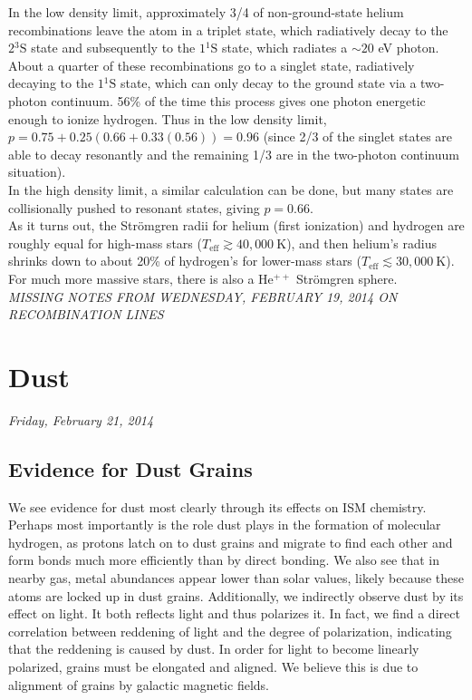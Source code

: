 \documentclass[10pt]{article}
\numberwithin{equation}{section}
\newcommand{\n}{\noindent}
\begin{document}
\n In the low density limit, approximately 3/4 of non-ground-state helium
recombinations leave the atom in a triplet state, which radiatively decay to
the $2 {}^3\mathrm{S}$ state and subsequently to the $1 {}^1\mathrm{S}$ state,
which radiates a $\sim 20$ eV photon. About a quarter of these recombinations
go to a singlet state, radiatively decaying to the $1{}^1\mathrm{S}$ state,
which can only decay to the ground state via a two-photon continuum. 56\% of
the time this process gives one photon energetic enough to ionize hydrogen.
Thus in the low density limit, $p=0.75 + 0.25(0.66+0.33(0.56))= 0.96$ (since
2/3 of the singlet states are able to decay resonantly and the remaining 1/3
are in the two-photon continuum situation).\\

\n In the high density limit, a similar calculation can be done, but many states
are collisionally pushed to resonant states, giving $p=0.66$.\\

\n As it turns out, the Str\"omgren radii for helium (first ionization) and
hydrogen are roughly equal for high-mass stars ($T_{\mathrm{eff}} \gtrsim
40,000\ \mathrm{K}$), and then helium's radius shrinks down to about 20\% of
hydrogen's for lower-mass stars ($T_{\mathrm{eff}}\lesssim 30,000\
\mathrm{K}$). For much more massive stars, there is also a $\mathrm{He^{++}}$
Str\"omgren sphere.\\

\n\textsl{MISSING NOTES FROM WEDNESDAY, FEBRUARY 19, 2014 ON RECOMBINATION
  LINES}
\section{Dust} %
\label{sec:dust}
\n \textit{Friday, February 21, 2014}

\subsection{Evidence for Dust Grains} %
\label{sub:evidence_for_dust_grains}
We see evidence for dust most clearly through its effects on ISM chemistry. 
Perhaps most importantly is the role dust plays in the formation of molecular 
hydrogen, as protons latch on to dust grains and migrate to find each other and
form bonds much more efficiently than by direct bonding. We also see that in 
nearby gas, metal abundances appear lower than solar values, likely because
these atoms are locked up in dust grains. Additionally, we indirectly observe
dust by its effect on light. It both reflects light and thus polarizes it. In
fact, we find a direct correlation between reddening of light and the degree of
polarization, indicating that the reddening is caused by dust. In order for 
light to become linearly polarized, grains must be elongated and aligned. We 
believe this is due to alignment of grains by galactic magnetic fields.\\
\end{document}
